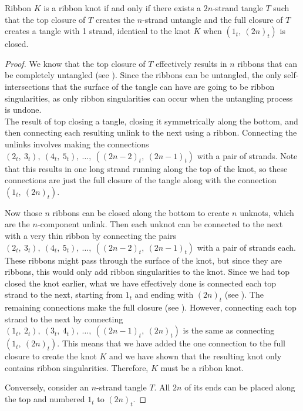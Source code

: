 \begin{paper}
\begin{paperthm}{Ribbon}
$K$ is a ribbon knot if and only if there exists a $2n$-strand tangle $T$ such
that the top closure of $T$ creates the $n$-strand untangle and the full closure
of $T$ creates a tangle with 1 strand, identical to the knot $K$ when
$(1_t,~(2n)_t)$ is closed.
\end{paperthm}
\begin{proof}
We know that the top closure of $T$ effectively results in $n$ ribbons that can
be completely untangled (see \figTop).
Since the ribbons can be untangled, the only self-intersections that the surface
of the tangle can have are going to be ribbon singularities, as only ribbon
singularities can occur when the untangling process is undone.\\

{The result of top closing a tangle, closing it symmetrically
along the bottom, and then connecting each resulting unlink to the next using a
ribbon.
Connecting the unlinks involves making the connections
$(2_t,~3_t),~(4_t,~5_t),~\dots,~((2n-2)_t,~(2n-1)_t)$ with a pair of strands.
Note that this results in one long strand running along the top of the knot, so
these connections are just the full closure of the tangle along with the
connection $(1_t,~(2n)_t)$.}

Now those $n$ ribbons can be closed along the bottom to create $n$ unknots,
which are the $n$-component unlink.
Then each unknot can be connected to the next with a very thin ribbon by
connecting the pairs $(2_t,~3_t),~(4_t,~5_t),~\dots,~((2n-2)_t,~(2n-1)_t)$ with
a pair of strands each.
These ribbons might pass through the surface of the knot, but since they are
ribbons, this would only add ribbon singularities to the knot.
Since we had top closed the knot earlier, what we have effectively done is
connected each top strand to the next, starting from $1_t$ and ending with
$(2n)_t$ (see \figProof).
The remaining connections make the full closure (see \figFull).
However, connecting each top strand to the next by connecting
$(1_t,~2_t),~(3_t,~4_t),~\dots,~((2n-1)_t,~(2n)_t)$ is the same as connecting
$(1_t,~(2n)_t)$.
This means that we have added the one connection to the full closure to create
the knot $K$ and we have shown that the resulting knot only contains ribbon
singularities.
Therefore, $K$ must be a ribbon knot.

Conversely, consider an $n$-strand tangle $T$.
All $2n$ of its ends can be placed along the top and numbered $1_t$ to $(2n)_t$.


\end{proof}
\end{paper}
